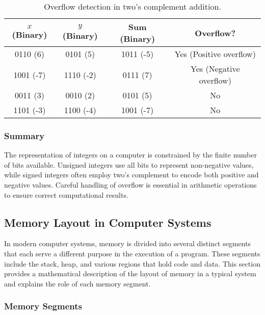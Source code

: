 \begin{table}[h]
	\centering
	\begin{tabular}{|c|c|c|c|}
		\hline
		\textbf{$x$ (Binary)} & \textbf{$y$ (Binary)} & \textbf{Sum (Binary)} & \textbf{Overflow?} \\ \hline
		0110 (6)              & 0101 (5)              & 1011 (-5)             & Yes (Positive overflow) \\ \hline
		1001 (-7)             & 1110 (-2)             & 0111 (7)              & Yes (Negative overflow) \\ \hline
		0011 (3)              & 0010 (2)              & 0101 (5)              & No  \\ \hline
		1101 (-3)             & 1100 (-4)             & 1001 (-7)             & No  \\ \hline
	\end{tabular}
	\caption{Overflow detection in two's complement addition.}
\end{table}

\subsubsection{Summary}

The representation of integers on a computer is constrained by the finite number of bits available. Unsigned integers use all bits to represent non-negative values, while signed integers often employ two's complement to encode both positive and negative values. Careful handling of overflow is essential in arithmetic operations to ensure correct computational results.

\newpage

\subsection{Memory Layout in Computer Systems}

In modern computer systems, memory is divided into several distinct segments that each serve a different purpose in the execution of a program. These segments include the stack, heap, and various regions that hold code and data. This section provides a mathematical description of the layout of memory in a typical system and explains the role of each memory segment.

\subsubsection{Memory Segments}


